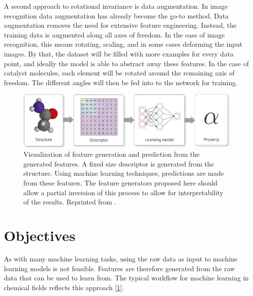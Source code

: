 A second approach to rotational invariance is data augmentation.
In image recognition data augmentation has already become the go-to method.
Data augmentation removes the need for extensive feature engineering.
Instead, the training data is augmented along all axes of freedom.
In the case of image recognition, this means rotating, scaling, and in some cases deforming the input images.
By that, the dataset will be filled with more examples for every data point, and ideally the model is able to 
abstract away these features. %
In the case of catalyst molecules, each element will be rotated around the remaining axis of freedom.
The different angles will then be fed into to the network for training.

\begin{figure}[H]
  \centering
  \includegraphics[width=12cm]{figures/introduction/chem-descriptor.jpg}
  \caption[Machine learning in chemistry]{Visualization of feature generation and prediction from the generated features. 
  A fixed size descriptor is generated from the structure. Using machine learning techniques, 
  predictions are made from these features.
  The feature generators proposed here should allow a partial inversion of this process to allow for interpretability of the results.
  Reprinted from \cite{dscribe}.}
  \label{fig:feature-process}
\end{figure}

\section{Objectives}

As with many machine learning tasks, using the raw data as input to machine learning models is not feasible.
Features are therefore generated from the raw data that can be used to learn from.
The typical workflow for machine learning in chemical fields reflects this approach [\ref{fig:feature-process}].

